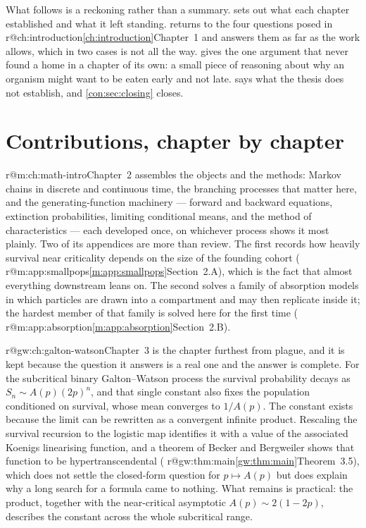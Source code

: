 \documentclass[11pt,a4paper]{report}
\makeatletter
\providecommand{\mextref}[2]{%
  \ifcsname r@#1\endcsname\cref{#1}\else#2\fi}
\providecommand{\Mextref}[2]{%
  \ifcsname r@#1\endcsname\Cref{#1}\else#2\fi}
\theoremstyle{plain}
\theoremstyle{remark}
\makeatother
\begin{document}
What follows is a reckoning rather than a summary. 
sets out what each chapter established and what it left standing.
 returns to the four questions posed in
\mextref{ch:introduction}{Chapter~1} and answers them as far as the work
allows, which in two cases is not all the way.
 gives the one argument that never found a home in a
chapter of its own: a small piece of reasoning about why an organism might
want to be eaten early and not late.  says what the
thesis does not establish, and \cref{con:sec:closing} closes.

\section{Contributions, chapter by chapter}
\label{con:sec:contributions}

\Mextref{m:ch:math-intro}{Chapter~2} assembles the objects and the methods:
Markov chains in discrete and continuous time, the branching processes that
matter here, and the generating-function machinery --- forward and backward
equations, extinction probabilities, limiting conditional means, and the
method of characteristics --- each developed once, on whichever process shows
it most plainly. Two of its appendices are more than review. The first
records how heavily survival near criticality depends on the size of the
founding cohort (\mextref{m:app:smallpops}{Section~2.A}), which is the fact
that almost everything downstream leans on. The second solves a family of
absorption models in which particles are drawn into a compartment and may
then replicate inside it; the hardest member of that family is solved here
for the first time (\mextref{m:app:absorption}{Section~2.B}).

\Mextref{gw:ch:galton-watson}{Chapter~3} is the chapter furthest from plague,
and it is kept because the question it answers is a real one and the answer
is complete. For the subcritical binary Galton--Watson process the
survival probability decays as $S_n\sim A(p)(2p)^n$, and that single constant
also fixes the population conditioned on survival, whose mean converges to
$1/A(p)$. The constant exists because the limit can be rewritten as a
convergent infinite product. Rescaling the survival recursion to the logistic
map identifies it with a value of the associated Koenigs linearising
function, and a theorem of Becker and Bergweiler shows that function to be
hypertranscendental (\mextref{gw:thm:main}{Theorem~3.5}), which does not
settle the closed-form question for $p\mapsto A(p)$ but does explain why a
long search for a formula came to nothing. What remains is practical: the
product, together with the near-critical asymptotic $A(p)\sim2(1-2p)$,
describes the constant across the whole subcritical range.
\end{document}
